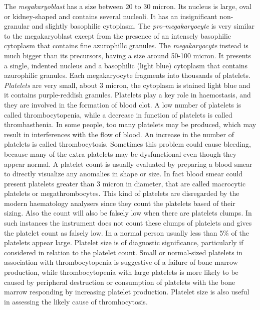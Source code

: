 \documentclass[final,a4paper,12pt,english]{UnicaPhdThesis3}
\begin{document}
	The \textit{megakaryoblast} has a size between 20 to 30 micron. Its nucleus is large, oval or kidney-shaped and contains several nucleoli. It has an insignificant non-granular and slightly basophilic cytoplasm. The \textit{pro-megakaryocyte} is very similar to the megakaryoblast except from the presence of an intensely basophilic cytoplasm that contains fine azurophillc granules. The \textit{megakaryocyte} instead is much bigger than its precursors, having a size around 50-100 micron. It presents a single, indented nucleus and a basophilic (light blue) cytoplasm that contains azurophilic granules. Each megakaryocyte fragments into thousands of platelets. \textit{Platelets} are very small, about 3 micron, the cytoplasm is stained light blue and it contains purple-reddish granules. Platelets play a key role in haemostasis, and they are involved in the formation of blood clot. A low number of platelets is called thrombocytopenia, while a decrease in function of platelets is called thrombasthenia. In some people, too many platelets may be produced, which may result in interferences with the flow of blood. An increase in the number of platelets is called thrombocytosis. Sometimes this problem could cause bleeding, because many of the extra platelets may be dysfunctional even though they appear normal. A platelet count is usually evaluated by preparing a blood smear to directly visualize any anomalies in shape or size. In fact blood smear could present platelets greater than 3 micron in diameter, that are called macrocytic platelets or megathrombocytes. This kind of platelets are disregarded by the modern haematology analysers since they count the platelets based of their sizing. Also the count will also be falsely low when there are platelets clumps. In such instances the instrument does not count these clumps of platelets and gives the platelet count as falsely low. In a normal person usually less than 5\% of the platelets appear large. Platelet size is of diagnostic significance, particularly if considered in relation to the platelet count. Small or normal-sized platelets in association with thrombocytopenia is suggestive of a failure of bone marrow production, while thrombocytopenia with large platelets is more likely to be caused by peripheral destruction or consumption of platelets with the bone marrow responding by increasing platelet production. Platelet size is also useful in assessing the likely cause of thromhocytosis. 
	
	\ifdraft{
		\listoffixmes
	}{}
	
\end{document}
